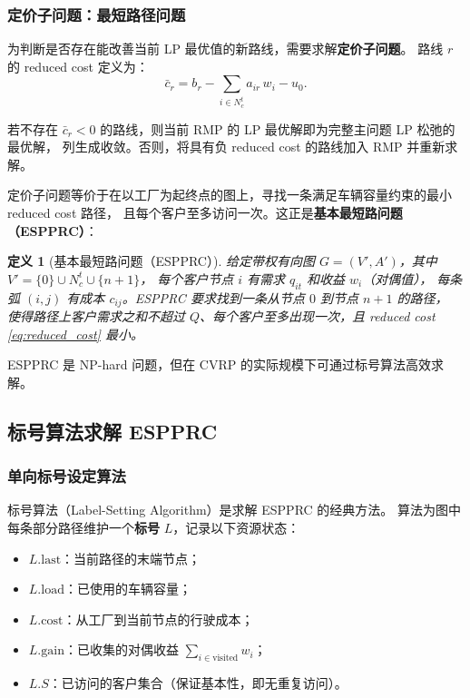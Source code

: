 \documentclass{article}
\newtheorem{definition}{定义}
\begin{document}
\subsubsection{定价子问题：最短路径问题}

为判断是否存在能改善当前 LP 最优值的新路线，需要求解\textbf{定价子问题}。
路线 $r$ 的 reduced cost 定义为：
\begin{equation}
\bar{c}_r = b_r - \sum_{i \in N_c^t} a_{ir}\,w_i - u_0.
\label{eq:reduced_cost}
\end{equation}

若不存在 $\bar{c}_r < 0$ 的路线，则当前 RMP 的 LP 最优解即为完整主问题 LP 松弛的最优解，
列生成收敛。否则，将具有负 reduced cost 的路线加入 RMP 并重新求解。

定价子问题等价于在以工厂为起终点的图上，寻找一条满足车辆容量约束的最小 reduced cost 路径，
且每个客户至多访问一次。这正是\textbf{基本最短路问题（ESPPRC）}：

\begin{definition}[基本最短路问题（ESPPRC）]
给定带权有向图 $G = (V', A')$，其中 $V' = \{0\} \cup N_c^t \cup \{n+1\}$，
每个客户节点 $i$ 有需求 $q_{it}$ 和收益 $w_i$（对偶值），
每条弧 $(i,j)$ 有成本 $c_{ij}$。ESPPRC 要求找到一条从节点 $0$ 到节点 $n+1$ 的路径，
使得路径上客户需求之和不超过 $Q$、每个客户至多出现一次，且 reduced cost \eqref{eq:reduced_cost} 最小。
\end{definition}

ESPPRC 是 NP-hard 问题，但在 CVRP 的实际规模下可通过标号算法高效求解。

\subsection{标号算法求解 ESPPRC}
\label{sec:labeling}

\subsubsection{单向标号设定算法}

标号算法（Label-Setting Algorithm）是求解 ESPPRC 的经典方法。
算法为图中每条部分路径维护一个\textbf{标号} $L$，记录以下资源状态：
\begin{itemize}[leftmargin=2em]
  \item $L.\text{last}$：当前路径的末端节点；
  \item $L.\text{load}$：已使用的车辆容量；
  \item $L.\text{cost}$：从工厂到当前节点的行驶成本；
  \item $L.\text{gain}$：已收集的对偶收益 $\sum_{i \in \text{visited}} w_i$；
  \item $L.S$：已访问的客户集合（保证基本性，即无重复访问）。
\end{itemize}
\end{document}

